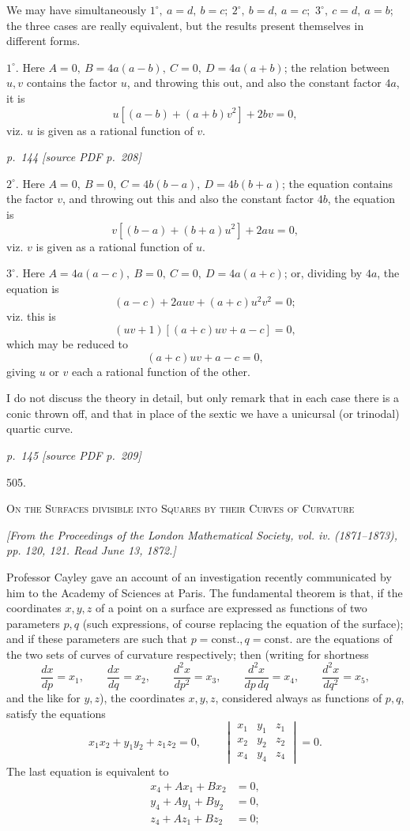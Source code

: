 \documentclass[11pt,a4paper]{article}
\newcommand{\sourcepage}[2]{%
  \bigskip
  \noindent\textit{p.~#1 [source PDF p.~#2]}%
  \par\smallskip
}
\newcommand{\paper}[2]{%
  \begin{center}
    {\Large #1.}\par\vspace{0.75em}
    {\large\scshape #2}
  \end{center}
}
\newcommand{\pubnote}[1]{%
  \begin{center}\small\itshape #1\end{center}
}
\newcommand{\detthree}[9]{%
  \begin{vmatrix}
  #1 & #2 & #3\\
  #4 & #5 & #6\\
  #7 & #8 & #9
  \end{vmatrix}}
\begin{document}
We may have simultaneously \(1^\circ,\ a=d,\ b=c;\ 2^\circ,\ b=d,\ a=c;\)
\(3^\circ,\ c=d,\ a=b\); the three cases are really equivalent, but the results
present themselves in different forms.

\(1^\circ\). Here \(A=0,\ B=4a(a-b),\ C=0,\ D=4a(a+b)\); the relation between
\(u,v\) contains the factor \(u\), and throwing this out, and also the constant factor
\(4a\), it is
\[
u[(a-b)+(a+b)v^2]+2bv=0,
\]
viz. \(u\) is given as a rational function of \(v\).

\sourcepage{144}{208}

\(2^\circ\). Here \(A=0,\ B=0,\ C=4b(b-a),\ D=4b(b+a)\); the equation contains the
factor \(v\), and throwing out this and also the constant factor \(4b\), the equation is
\[
v[(b-a)+(b+a)u^2]+2au=0,
\]
viz. \(v\) is given as a rational function of \(u\).

\(3^\circ\). Here \(A=4a(a-c),\ B=0,\ C=0,\ D=4a(a+c)\); or, dividing by \(4a\), the
equation is
\[
(a-c)+2auv+(a+c)u^2v^2=0;
\]
viz. this is
\[
(uv+1)[(a+c)uv+a-c]=0,
\]
which may be reduced to
\[
(a+c)uv+a-c=0,
\]
giving \(u\) or \(v\) each a rational function of the other.

I do not discuss the theory in detail, but only remark that in each case there is
a conic thrown off, and that in place of the sextic we have a unicursal (or trinodal)
quartic curve.

\sourcepage{145}{209}
\paper{505}{On the Surfaces divisible into Squares by their Curves of Curvature}
\pubnote{[From the Proceedings of the London Mathematical Society, vol. iv. (1871--1873), pp. 120, 121. Read June 13, 1872.]}

Professor Cayley gave an account of an investigation recently communicated by
him to the Academy of Sciences at Paris. The fundamental theorem is that, if the
coordinates \(x,y,z\) of a point on a surface are expressed as functions of two
parameters \(p,q\) (such expressions, of course replacing the equation of the surface);
and if these parameters are such that \(p=\mathrm{const.}, q=\mathrm{const.}\) are the equations
of the two sets of curves of curvature respectively; then (writing for shortness
\[
\frac{dx}{dp}=x_1,\qquad \frac{dx}{dq}=x_2,\qquad
\frac{d^2x}{dp^2}=x_3,\qquad
\frac{d^2x}{dp\,dq}=x_4,\qquad
\frac{d^2x}{dq^2}=x_5,
\]
and the like for \(y,z\)), the coordinates \(x,y,z\), considered always as functions
of \(p,q\), satisfy the equations
\[
x_1x_2+y_1y_2+z_1z_2=0,\qquad
\detthree{x_1}{y_1}{z_1}{x_2}{y_2}{z_2}{x_4}{y_4}{z_4}=0.
\]
The last equation is equivalent to
\[
\begin{aligned}
x_4+Ax_1+Bx_2&=0,\\
y_4+Ay_1+By_2&=0,\\
z_4+Az_1+Bz_2&=0;
\end{aligned}
\]
\end{document}
